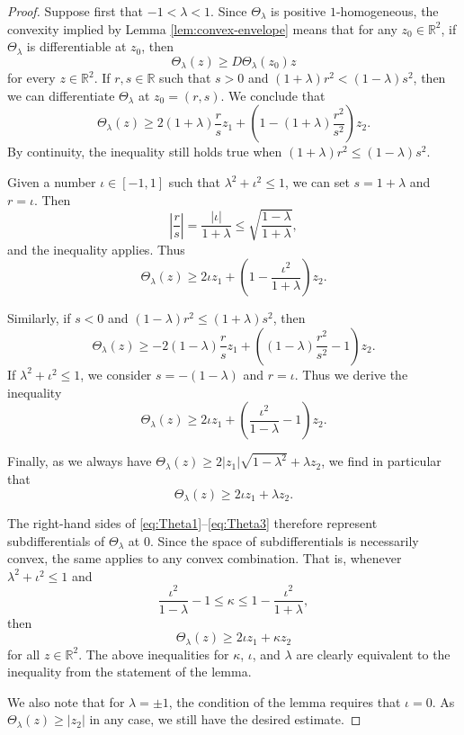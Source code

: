 \documentclass[a4paper]{article}
\newcommand{\R}{\mathbb{R}}
\theoremstyle{definition}
\theoremstyle{remark}
\begin{document}
\begin{proof}
Suppose first that $-1 < \lambda < 1$. Since $\Theta_\lambda$ is positive $1$-homogeneous,
the convexity implied by Lemma \ref{lem:convex-envelope} means that for any $z_0 \in \R^2$, if $\Theta_\lambda$ is
differentiable at $z_0$, then
\[
\Theta_\lambda(z) \ge D\Theta_\lambda(z_0)z
\]
for every $z \in \R^2$. If $r, s \in \R$ such that $s> 0$ and
$(1 + \lambda) r^2 < (1 - \lambda) s^2$, then we can differentiate $\Theta_\lambda$ at $z_0 = (r, s)$. We conclude that
\[
\Theta_\lambda(z) \ge 2(1 + \lambda) \frac{r}{s} z_1 + \left(1 - (1 + \lambda)\frac{r^2}{s^2}\right)z_2.
\]
By continuity, the inequality still holds true when
$(1 + \lambda) r^2 \le (1 - \lambda) s^2$.

Given a number $\iota \in [-1, 1]$ such that $\lambda^2 + \iota^2 \le 1$,
we can set $s = 1 + \lambda$ and $r = \iota$. Then
\[
\left|\frac{r}{s}\right| = \frac{|\iota|}{1 + \lambda} \le \sqrt{\frac{1 - \lambda}{1 + \lambda}},
\]
and the inequality applies. Thus
\begin{equation} \label{eq:Theta1}
\Theta_\lambda(z) \ge 2\iota z_1 + \left(1 - \frac{\iota^2}{1 + \lambda}\right)z_2.
\end{equation}

Similarly, if $s <0$ and $(1 - \lambda) r^2 \le (1 + \lambda) s^2$, then
\[
\Theta_\lambda(z) \ge -2(1 - \lambda) \frac{r}{s} z_1 + \left((1 - \lambda)\frac{r^2}{s^2} - 1\right)z_2.
\]
If $\lambda^2 + \iota^2 \le 1$, we consider $s = -(1 - \lambda)$ and
$r = \iota$. Thus we derive the inequality
\begin{equation} \label{eq:Theta2}
\Theta_\lambda(z) \ge 2\iota z_1 + \left(\frac{\iota^2}{1 - \lambda} - 1\right)z_2.
\end{equation}

Finally, as we always have $\Theta_\lambda(z) \ge 2|z_1| \sqrt{1 - \lambda^2} + \lambda z_2$, we find in particular that
\begin{equation} \label{eq:Theta3}
\Theta_\lambda(z) \ge 2\iota z_1 + \lambda z_2.
\end{equation}

The right-hand sides of \eqref{eq:Theta1}--\eqref{eq:Theta3} therefore
represent subdifferentials of $\Theta_\lambda$ at $0$. Since the space of
subdifferentials is necessarily convex, the same applies to any convex
combination. That is, whenever $\lambda^2 + \iota^2 \le 1$ and
\[
\frac{\iota^2}{1 - \lambda} - 1 \le \kappa \le 1 - \frac{\iota^2}{1 + \lambda},
\]
then
\[
\Theta_\lambda(z) \ge 2\iota z_1 + \kappa z_2
\]
for all $z \in \R^2$. The above inequalities for $\kappa$, $\iota$, and $\lambda$ are clearly
equivalent to the inequality from the statement of the lemma.

We also note that for $\lambda = \pm 1$, the condition of the lemma requires that $\iota = 0$.
As $\Theta_\lambda(z) \ge |z_2|$ in any case, we still have the desired estimate.
\end{proof}
\end{document}
